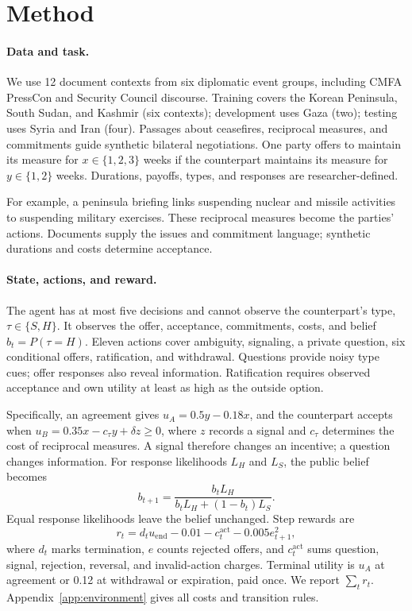 \section{Method}

\paragraph{Data and task.}

We use 12 document contexts from six diplomatic event groups, including CMFA PressCon \citep{mochtak2021corpus} and Security Council discourse. Training covers the Korean Peninsula, South Sudan, and Kashmir (six contexts); development uses Gaza (two); testing uses Syria and Iran (four). Passages about ceasefires, reciprocal measures, and commitments guide synthetic bilateral negotiations. One party offers to maintain its measure for $x\in\{1,2,3\}$ weeks if the counterpart maintains its measure for $y\in\{1,2\}$ weeks. Durations, payoffs, types, and responses are researcher-defined.

For example, a peninsula briefing links suspending nuclear and missile activities to suspending military exercises. These reciprocal measures become the parties' actions. Documents supply the issues and commitment language; synthetic durations and costs determine acceptance.

\paragraph{State, actions, and reward.}

The agent has at most five decisions and cannot observe the counterpart's type, $\tau\in\{S,H\}$. It observes the offer, acceptance, commitments, costs, and belief $b_t=P(\tau=H)$. Eleven actions cover ambiguity, signaling, a private question, six conditional offers, ratification, and withdrawal. Questions provide noisy type cues; offer responses also reveal information. Ratification requires observed acceptance and own utility at least as high as the outside option.

Specifically, an agreement gives $u_A=0.5y-0.18x$, and the counterpart accepts when $u_B=0.35x-c_\tau y+\delta z\geq0$, where $z$ records a signal and $c_\tau$ determines the cost of reciprocal measures. A signal therefore changes an incentive; a question changes information. For response likelihoods $L_H$ and $L_S$, the public belief becomes
\begin{equation}
 b_{t+1}=\frac{b_tL_H}{b_tL_H+(1-b_t)L_S}.
\end{equation}
Equal response likelihoods leave the belief unchanged. Step rewards are
\begin{equation}
 r_t=d_tu_{\mathrm{end}}-0.01-c^{\mathrm{act}}_t-0.005e_{t+1}^2,
\end{equation}
where $d_t$ marks termination, $e$ counts rejected offers, and $c^{\mathrm{act}}_t$ sums question, signal, rejection, reversal, and invalid-action charges. Terminal utility is $u_A$ at agreement or 0.12 at withdrawal or expiration, paid once. We report $\sum_t r_t$. Appendix~\ref{app:environment} gives all costs and transition rules.

